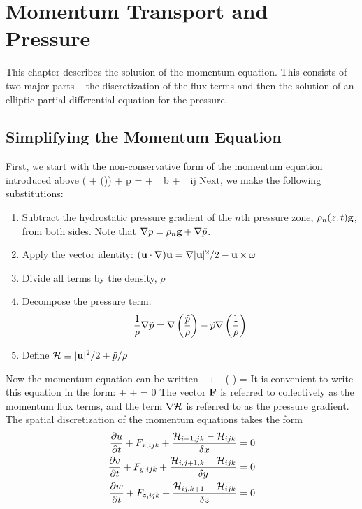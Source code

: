 \chapter{Momentum Transport and Pressure}
\label{momentum_chapter}

This chapter describes the solution of the momentum equation. This consists of two major parts -- the
discretization of the flux terms and then the solution of an elliptic partial differential equation for the
pressure.

\section{Simplifying the Momentum Equation}

First, we start with the non-conservative form of the momentum equation introduced above
\be \rho \left(  + (\bu \cdot \nabla)\bu  \right) + \nabla p = \rho \bg + \bof_b + \nabla\!\cdot \btau_{ij}  \ee
Next, we make the following substitutions:
\begin{enumerate}
\item Subtract the hydrostatic pressure gradient of the $n$th pressure zone, $\rho_n(z,t) {\bf g}$, from both sides. Note that
$\nabla p=\rho_n {\bf g} + \nabla \tilde{p}$.
\item Apply the vector identity: $({\bf u} \cdot \nabla) {\bf u} = \nabla|{\bf u}|^2/2 - {\bf u}\times{\bf \omega} $
\item Divide all terms by the density, $\rho$
\item Decompose the pressure term:
   $$ \frac{1}{\rho} \nabla \tilde{p} = \nabla \left( \frac{\tilde{p}}{\rho}\right) - \tilde{p} \nabla \left(\frac{1}{\rho} \right)  $$
\item Define ${\cal H} \equiv |{\bf u}|^2/2 + \tilde{p}/\rho $
\end{enumerate}
Now the momentum equation can be written
\be {} - \bu\times\bo +  - \tp \nabla \left( \right) =    \label{momeq} \ee
It is convenient to write this equation in the form:
\be {} + \bF + \nabla \cH = 0 \label{simple_momentum_equation} \ee
The vector ${\bf F}$ is referred to collectively as the momentum flux terms, and the term $\nabla {\cal H}$ is referred to as the
pressure gradient. The spatial discretization of the momentum equations takes the form
\begin{eqnarray}
\frac{\partial u}{\partial t} + F_{x,ijk} + \frac{{\cal H}_{i+1,jk} -{\cal H}_{ijk}}{\delta x} = 0  \label{umom} \\
\frac{\partial v}{\partial t} + F_{y,ijk} + \frac{{\cal H}_{i,j+1,k}-{\cal H}_{ijk}}{\delta y} = 0  \label{vmom} \\
\frac{\partial w}{\partial t} + F_{z,ijk} + \frac{{\cal H}_{ij,k+1} -{\cal H}_{ijk}}{\delta z} = 0  \label{wmom}
\end{eqnarray}
